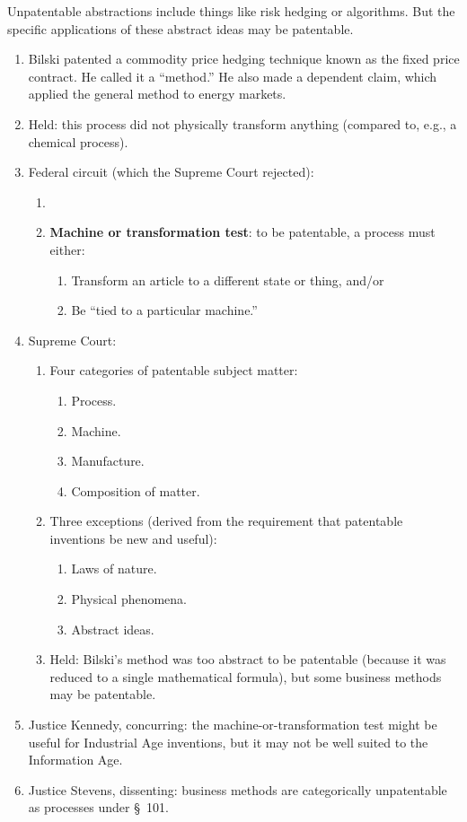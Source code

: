 Unpatentable abstractions include things like risk hedging or algorithms. But 
the specific applications of these abstract ideas may be patentable.

\begin{enumerate}
    \item Bilski patented a commodity price hedging technique known as the fixed 
    price contract. He called it a ``method.'' He also made a dependent claim, 
    which applied the general method to energy markets.
    \item Held: this process did not physically transform anything (compared to, 
    e.g., a chemical process).
    \item Federal circuit (which the Supreme Court rejected):
    \begin{enumerate}
        \item 
        \item \textbf{Machine or transformation test}: to be patentable, a 
        process must either:
        \begin{enumerate}
            \item Transform an article to a different state or thing, and/or
            \item Be ``tied to a particular machine.''
        \end{enumerate}
    \end{enumerate}
    \item Supreme Court:
    \begin{enumerate}
        \item Four categories of patentable subject matter:
        \begin{enumerate}
            \item Process.
            \item Machine. 
            \item Manufacture.
            \item Composition of matter.
        \end{enumerate}
        \item Three exceptions (derived from the requirement that patentable 
        inventions be new and useful):
        \begin{enumerate}
            \item Laws of nature.
            \item Physical phenomena.
            \item Abstract ideas.
        \end{enumerate}
        \item Held: Bilski's method was too abstract to be patentable (because 
        it was reduced to a single mathematical formula), but some business 
        methods may be patentable.
    \end{enumerate}
    \item Justice Kennedy, concurring: the machine-or-transformation test might 
    be useful for Industrial Age inventions, but it may not be well suited to 
    the Information Age.
    \item Justice Stevens, dissenting: business methods are categorically 
    unpatentable as processes under \S\ 101.
\end{enumerate}

